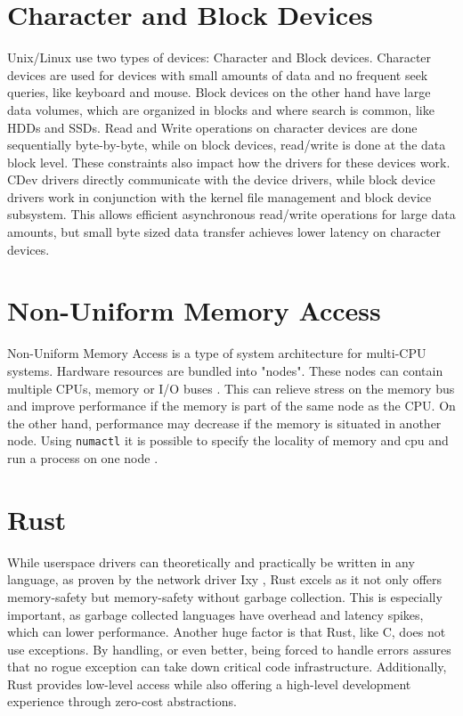 \section{Character and Block Devices}
Unix/Linux use two types of devices: Character and Block devices. Character devices are used for devices with small amounts of data and no frequent seek queries, like keyboard and mouse. Block devices on the other hand have large data volumes, which are organized in blocks and where search is common, like HDDs and SSDs.
Read and Write operations on character devices are done sequentially byte-by-byte, while on block devices, read/write is done at the data block level.
These constraints also impact how the drivers for these devices work. CDev drivers directly communicate with the device drivers, while block device drivers work in conjunction with the kernel file management and block device subsystem. This allows efficient asynchronous read/write operations for large data amounts, but small byte sized data transfer achieves lower latency on character devices.

\section{Non-Uniform Memory Access}
Non-Uniform Memory Access is a type of system architecture for multi-CPU systems. Hardware resources are bundled into "nodes". These nodes can contain multiple CPUs, memory or I/O buses \cite{numakerneldocs}. This can relieve stress on the memory bus and improve performance if the memory is part of the same node as the CPU. On the other hand, performance may decrease if the memory is situated in another node. Using \texttt{numactl} it is possible to specify the locality of memory and cpu and run a process on one node \cite{numactlmanpage}.

\section{Rust}
While userspace drivers can theoretically and practically be written in any language, as proven by the network driver Ixy \cite{ixylanggithub}, Rust excels as it not only offers memory-safety but memory-safety without garbage collection. This is especially important, as garbage collected languages have overhead and latency spikes, which can lower performance. Another huge factor is that Rust, like C, does not use exceptions. By handling, or even better, being forced to handle errors assures that no rogue exception can take down critical code infrastructure.
Additionally, Rust provides low-level access while also offering a high-level development experience through zero-cost abstractions.
